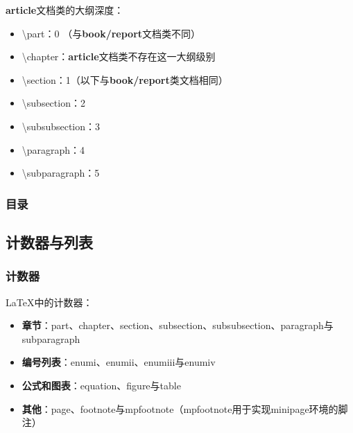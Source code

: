 \documentclass{ctexart}
\begin{document}
            \textbf{article}文档类的大纲深度：

            \begin{itemize}
                \item \textbackslash part：0 （与\textbf{book/report}文档类不同）
                \item \textbackslash chapter：\textbf{article}文档类不存在这一大纲级别
                \item \textbackslash section：1（以下与\textbf{book/report}类文档相同）
                \item \textbackslash subsection：2
                \item \textbackslash subsubsection：3
                \item \textbackslash paragraph：4
                \item \textbackslash subparagraph：5
            \end{itemize}


        \subsubsection{目录}

    \subsection{计数器与列表}
        \subsubsection{计数器}
            \LaTeX 中的计数器：
            \begin{itemize}
                \item \textbf{章节}：part、chapter、section、subsection、subsubsection、paragraph与subparagraph
                \item \textbf{编号列表}：enumi、enumii、enumiii与enumiv
                \item \textbf{公式和图表}：equation、figure与table
                \item \textbf{其他}：page、footnote与mpfootnote（mpfootnote用于实现minipage环境的脚注）
            \end{itemize}
\end{document}
